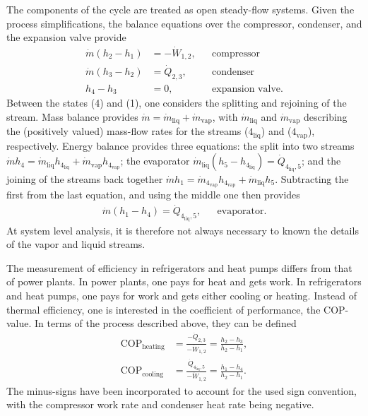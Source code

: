 The components of the cycle are treated as open steady-flow systems. Given the process simplifications, the balance equations over the compressor, condenser, and the expansion valve provide
\begin{align}
    \dot{m}(h_2-h_1)&=-\dot{W}_{1,2}, & &\text{compressor}\\
    \dot{m}(h_3-h_2)&=\dot{Q}_{2,3}, & &\text{condenser}\\
    h_4-h_3&=0, & &\text{expansion valve}.
\end{align}
Between the states (4) and (1), one considers the splitting and rejoining of the stream. Mass balance provides $\dot{m}=\dot{m}_\text{liq}+\dot{m}_\text{vap}$, with $\dot{m}_\text{liq}$ and $\dot{m}_\text{vap}$ describing the (positively valued) mass-flow rates for the streams ($4_\text{liq}$) and ($4_\text{vap}$), respectively. Energy balance provides three equations: the split into two streams $\dot{m}h_4=\dot{m}_\text{liq}h_{4_\text{liq}}+\dot{m}_\text{vap}h_{4_\text{vap}}$; the evaporator $\dot{m}_\text{liq}(h_5-h_{4_\text{liq}})=\dot{Q}_{4_\text{liq},5}$; and the joining of the streams back together $\dot{m}h_1=\dot{m}_{4_\text{vap}}h_{4_\text{vap}}+\dot{m}_{\text{liq}}h_5$. Subtracting the first from the last equation, and using the middle one then provides
\begin{align}
    \dot{m}(h_1-h_4)=\dot{Q}_{4_\text{liq},5}, & &\text{evaporator}.
\end{align}
At system level analysis, it is therefore not always necessary to known the details of the vapor and liquid streams.

The measurement of efficiency in refrigerators and heat pumps differs from that of power plants. In power plants, one pays for heat and gets work. In refrigerators and heat pumps, one pays for work and gets either cooling or heating. Instead of thermal efficiency, one is interested in the coefficient of performance, the COP-value. In terms of the process described above, they can be defined
\begin{align}
    \text{COP}_\text{heating}&=\frac{-\dot{Q}_{2,3}}{-\dot{W}_{1,2}}=\frac{h_2-h_3}{h_2-h_1},\\
    \text{COP}_\text{cooling}&=\frac{\dot{Q}_{4_\text{liq},5}}{-\dot{W}_{1,2}}=\frac{h_1-h_4}{h_2-h_1}.
\end{align}
The minus-signs have been incorporated to account for the used sign convention, with the compressor work rate and condenser heat rate being negative.

